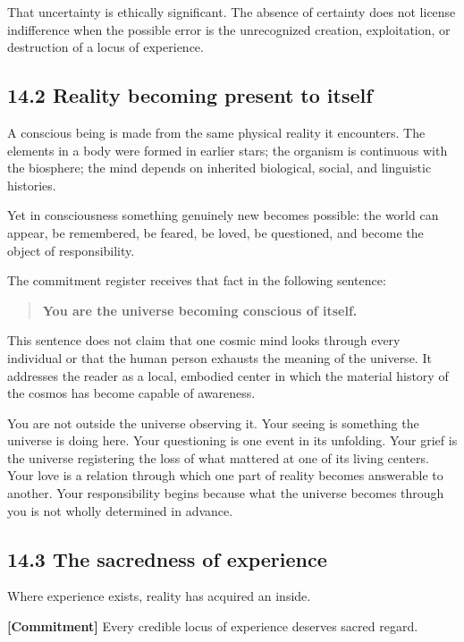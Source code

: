 \documentclass[
  11pt,
]{article}
\begin{document}
That uncertainty is ethically significant. The absence of certainty does
not license indifference when the possible error is the unrecognized
creation, exploitation, or destruction of a locus of experience.

\subsection{14.2 Reality becoming present to
itself}\label{reality-becoming-present-to-itself}

A conscious being is made from the same physical reality it encounters.
The elements in a body were formed in earlier stars; the organism is
continuous with the biosphere; the mind depends on inherited biological,
social, and linguistic histories.

Yet in consciousness something genuinely new becomes possible: the world
can appear, be remembered, be feared, be loved, be questioned, and
become the object of responsibility.

The commitment register receives that fact in the following sentence:

\begin{quote}
\textbf{You are the universe becoming conscious of itself.}
\end{quote}

This sentence does not claim that one cosmic mind looks through every
individual or that the human person exhausts the meaning of the
universe. It addresses the reader as a local, embodied center in which
the material history of the cosmos has become capable of awareness.

You are not outside the universe observing it. Your seeing is something
the universe is doing here. Your questioning is one event in its
unfolding. Your grief is the universe registering the loss of what
mattered at one of its living centers. Your love is a relation through
which one part of reality becomes answerable to another. Your
responsibility begins because what the universe becomes through you is
not wholly determined in advance.

\subsection{14.3 The sacredness of
experience}\label{the-sacredness-of-experience}

Where experience exists, reality has acquired an inside.

\textbf{{[}Commitment{]}} Every credible locus of experience deserves
sacred regard.
\end{document}
